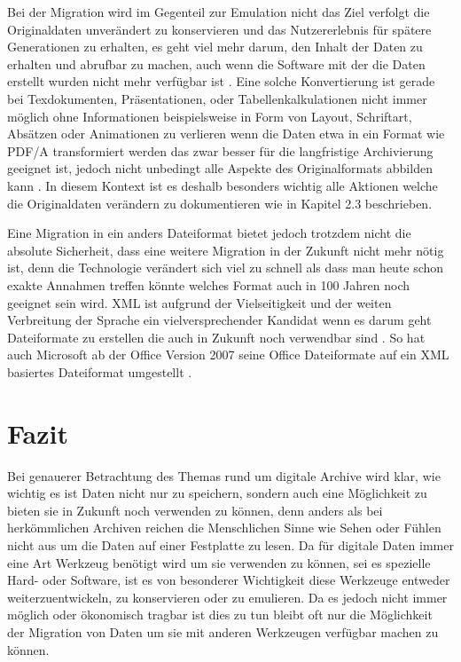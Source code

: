 \documentclass[conference,compsoc,final,a4paper]{IEEEtran}
\begin{document}
Bei der Migration wird im Gegenteil zur Emulation nicht das Ziel verfolgt die Originaldaten unverändert zu konservieren und das Nutzererlebnis für spätere Generationen zu erhalten, es geht viel mehr darum, den Inhalt der Daten zu erhalten und abrufbar zu machen, auch wenn die Software mit der die Daten erstellt wurden nicht mehr verfügbar ist \autocite{Lee2002}. Eine solche Konvertierung ist gerade bei Texdokumenten, Präsentationen, oder Tabellenkalkulationen nicht immer möglich ohne Informationen beispielsweise in Form von Layout, Schriftart, Absätzen oder Animationen zu verlieren wenn die Daten etwa in ein Format wie \acs{PDF}/A transformiert werden das zwar besser für die langfristige Archivierung geeignet ist, jedoch nicht unbedingt alle Aspekte des Originalformats abbilden kann \autocite{Reichherzer2006}. In diesem Kontext ist es deshalb besonders wichtig alle Aktionen welche die Originaldaten verändern zu dokumentieren wie in Kapitel 2.3 beschrieben.

Eine Migration in ein anders Dateiformat bietet jedoch trotzdem nicht die absolute Sicherheit, dass eine weitere Migration in der Zukunft nicht mehr nötig ist, denn die Technologie verändert sich viel zu schnell als dass man heute schon exakte Annahmen treffen könnte welches Format auch in 100 Jahren noch geeignet sein wird. \ac{XML} ist aufgrund der Vielseitigkeit und der weiten Verbreitung der Sprache ein vielversprechender Kandidat wenn es darum geht Dateiformate zu erstellen die auch in Zukunft noch verwendbar sind \autocite{Lee2002}. So hat auch Microsoft ab der Office Version 2007 seine Office Dateiformate auf ein \acs{XML} basiertes Dateiformat umgestellt \autocite{MSOpenXML}.

\section{Fazit}
Bei genauerer Betrachtung des Themas rund um digitale Archive wird klar, wie wichtig es ist Daten nicht nur zu speichern, sondern auch eine Möglichkeit zu bieten sie in Zukunft noch verwenden zu können, denn anders als bei herkömmlichen Archiven reichen die Menschlichen Sinne wie Sehen oder Fühlen nicht aus um die Daten auf einer Festplatte zu lesen. Da für digitale Daten immer eine Art Werkzeug benötigt wird um sie verwenden zu können, sei es spezielle Hard- oder Software, ist es von besonderer Wichtigkeit diese Werkzeuge entweder weiterzuentwickeln, zu konservieren oder zu emulieren. Da es jedoch nicht immer möglich oder ökonomisch tragbar ist dies zu tun bleibt oft nur die Möglichkeit der Migration von Daten um sie mit anderen Werkzeugen verfügbar machen zu können.
\end{document}
